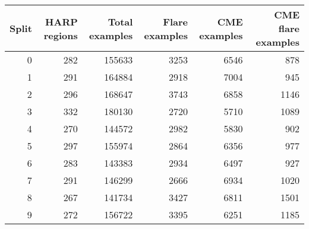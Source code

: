 \begin{tabular}{rrrrrr}
\toprule
Split & HARP regions & Total examples & Flare examples & CME examples & CME flare examples \\
\midrule
0 & 282 & 155633 & 3253 & 6546 & 878 \\
1 & 291 & 164884 & 2918 & 7004 & 945 \\
2 & 296 & 168647 & 3743 & 6858 & 1146 \\
3 & 332 & 180130 & 2720 & 5710 & 1089 \\
4 & 270 & 144572 & 2982 & 5830 & 902 \\
5 & 297 & 155974 & 2864 & 6356 & 977 \\
6 & 283 & 143383 & 2934 & 6497 & 927 \\
7 & 291 & 146299 & 2666 & 6934 & 1020 \\
8 & 267 & 141734 & 3427 & 6811 & 1501 \\
9 & 272 & 156722 & 3395 & 6251 & 1185 \\
\bottomrule
\end{tabular}
